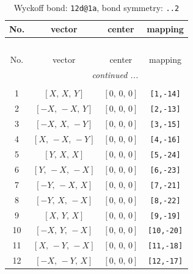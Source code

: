 \documentclass[fleqn,8pt]{jsarticle}
\begin{document}
\begin{longtable}{cccc}
\caption{Wyckoff bond: {\tt 12d@1a}, bond symmetry: {\tt ..2}}
 \\
 \hline \hline
No. & vector & center & mapping \\ \hline \endfirsthead

\multicolumn{3}{l}{\tablename\ \thetable{}} \\
 \hline \hline
No. & vector & center & mapping \\ \hline \endhead

 \hline \hline
\multicolumn{3}{r}{\footnotesize\it continued ...} \\ \endfoot

 \hline \hline
\multicolumn{3}{r}{} \\ \endlastfoot

1 & $\left[ X,\, X,\, Y \right]$ & $\left[ 0,\, 0,\, 0 \right]$ & {\tt [1,-14]} \\ \hline
2 & $\left[ - X,\, - X,\, Y \right]$ & $\left[ 0,\, 0,\, 0 \right]$ & {\tt [2,-13]} \\ \hline
3 & $\left[ - X,\, X,\, - Y \right]$ & $\left[ 0,\, 0,\, 0 \right]$ & {\tt [3,-15]} \\ \hline
4 & $\left[ X,\, - X,\, - Y \right]$ & $\left[ 0,\, 0,\, 0 \right]$ & {\tt [4,-16]} \\ \hline
5 & $\left[ Y,\, X,\, X \right]$ & $\left[ 0,\, 0,\, 0 \right]$ & {\tt [5,-24]} \\ \hline
6 & $\left[ Y,\, - X,\, - X \right]$ & $\left[ 0,\, 0,\, 0 \right]$ & {\tt [6,-23]} \\ \hline
7 & $\left[ - Y,\, - X,\, X \right]$ & $\left[ 0,\, 0,\, 0 \right]$ & {\tt [7,-21]} \\ \hline
8 & $\left[ - Y,\, X,\, - X \right]$ & $\left[ 0,\, 0,\, 0 \right]$ & {\tt [8,-22]} \\ \hline
9 & $\left[ X,\, Y,\, X \right]$ & $\left[ 0,\, 0,\, 0 \right]$ & {\tt [9,-19]} \\ \hline
10 & $\left[ - X,\, Y,\, - X \right]$ & $\left[ 0,\, 0,\, 0 \right]$ & {\tt [10,-20]} \\ \hline
11 & $\left[ X,\, - Y,\, - X \right]$ & $\left[ 0,\, 0,\, 0 \right]$ & {\tt [11,-18]} \\ \hline
12 & $\left[ - X,\, - Y,\, X \right]$ & $\left[ 0,\, 0,\, 0 \right]$ & {\tt [12,-17]} \\
\end{longtable}
\renewcommand{\arraystretch}{1.2}
\end{document}
